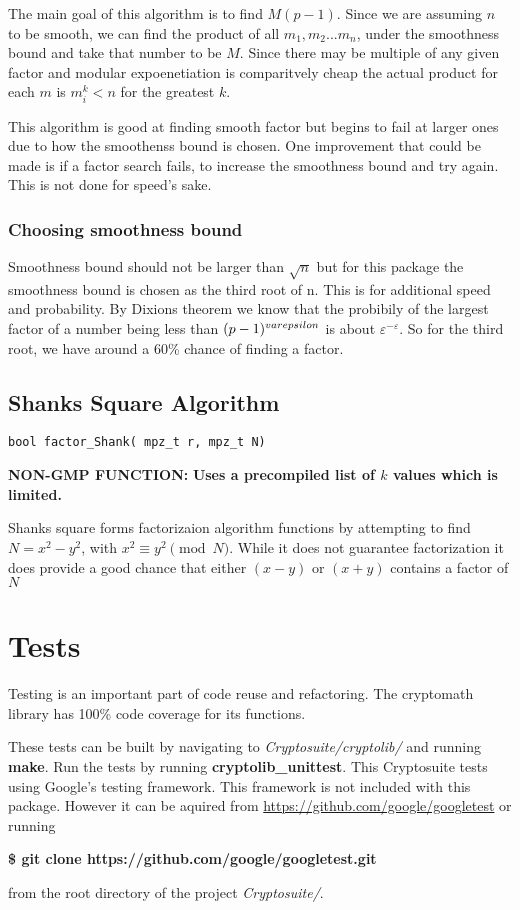 The main goal of this algorithm is to find $M(p-1)$.
Since we are assuming $n$ to be smooth, we can find the product of all $m_1,m_2...m_n$, under the smoothness bound and take that number to be $M$.
Since there may be multiple of any given factor and modular expoenetiation is comparitvely cheap the actual product for each $m$ is $m_i^k < n$ for the greatest $k$.

This algorithm is good at finding smooth factor but begins to fail at larger ones due to how the smoothenss bound is chosen.
One improvement that could be made is if a factor search fails, to increase the smoothness bound and try again.
This is not done for speed's sake.

\subsubsection{Choosing smoothness bound}
Smoothness bound should not be larger than $\sqrt{n}$ but for this package the smoothness bound is chosen as the third root of n.
This is for additional speed and probability.
By Dixions theorem we know that the probibily of the largest factor of a number being less than $(p-1)^{\\varepsilon}$ is about $\varepsilon^{-\varepsilon}$.
So for the third root, we have around a 60\% chance of finding a factor.

\subsection{Shanks Square Algorithm}
\begin{verbatim}
bool factor_Shank( mpz_t r, mpz_t N)
\end{verbatim}
\textbf{ NON-GMP FUNCTION:}
\textbf{Uses a precompiled list of $k$ values which is limited.} 

Shanks square forms factorizaion algorithm functions by attempting to find $N = x^2 - y^2$, with $x^2 \equiv y^2 \pmod N$.
While it does not guarantee factorization it does provide a good chance that either $(x-y)$ or $(x+y)$ contains a factor of $N$


\section{Tests}

Testing is an important part of code reuse and refactoring.
The cryptomath library has 100\% code coverage for its functions.

These tests can be built by navigating to \textit{Cryptosuite/cryptolib/} and running \textbf{make}.
Run the tests by running \textbf{cryptolib\_unittest}.
This Cryptosuite tests using Google's testing framework.
This framework is not included with this package.
However it can be aquired from \url{https://github.com/google/googletest} or running 
\begin{center}
\textbf{ \$ git clone https://github.com/google/googletest.git} 
\end{center}

from the root directory of the project \textit{Cryptosuite/}.
